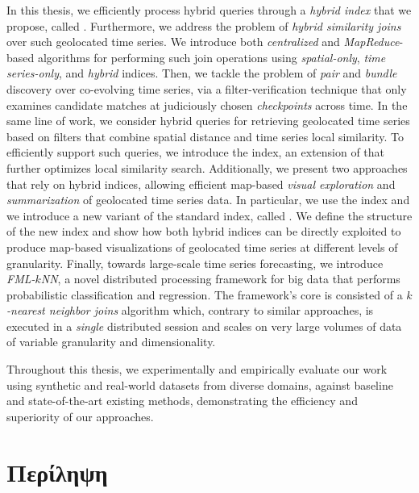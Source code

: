 In this thesis, we efficiently process hybrid queries through a \textit{hybrid index} that we propose, called \textit{\btsr}. Furthermore, we address the problem of \textit{hybrid similarity joins} over such geolocated time series. We introduce both \textit{centralized} and \textit{MapReduce}-based algorithms for performing such join operations using \textit{spatial-only}, \textit{time series-only}, and \textit{hybrid} indices. Then, we tackle the problem of \textit{pair} and \textit{bundle} discovery over co-evolving time series, via a filter-verification technique that only examines candidate matches at judiciously chosen \textit{checkpoints} across time. In the same line of work, we consider hybrid queries for retrieving geolocated time series based on filters that combine spatial distance and time series local similarity. To efficiently support such queries, we introduce the \textit{\sbtsr} index, an extension of \btsr that further optimizes local similarity search. Additionally, we present two approaches that rely on hybrid indices, allowing efficient map-based \textit{visual exploration} and \textit{summarization} of geolocated time series data. In particular, we use the \btsr index and we introduce a new variant of the standard \textit{\isax} index, called \textit{\hisax}. We define the structure of the new index and show how both hybrid indices can be directly exploited to produce map-based visualizations of geolocated time series at different levels of granularity. Finally, towards large-scale time series forecasting, we introduce \textit{FML-$k$NN}, a novel distributed processing framework for big data that performs probabilistic classification and regression. The framework's core is consisted of a \textit{$k$-nearest neighbor joins} algorithm which, contrary to similar approaches, is executed in a \textit{single} distributed session and scales on very large volumes of data of variable granularity and dimensionality.

Throughout this thesis, we experimentally and empirically evaluate our work using synthetic and real-world datasets from diverse domains, against baseline and state-of-the-art existing methods, demonstrating the efficiency and superiority of our approaches.

\chapter{Περίληψη}


